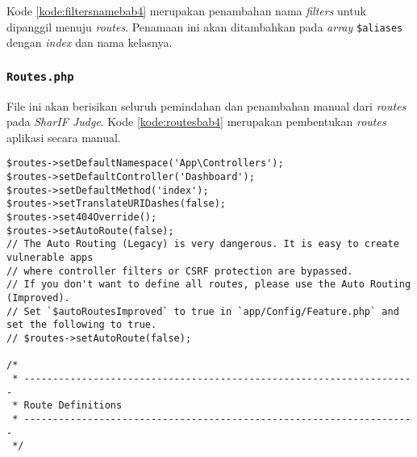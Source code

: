 Kode \ref{kode:filtersnamebab4} merupakan penambahan nama \textit{filters} untuk dipanggil menuju \textit{routes}. Penamaan ini akan ditambahkan pada \textit{array} \verb|$aliases| dengan \textit{index} dan nama kelasnya.
\subsubsection{\texttt{Routes.php}}
File ini akan berisikan seluruh pemindahan dan penambahan manual dari \textit{routes} pada \textit{SharIF Judge}. Kode \ref{kode:routesbab4} merupakan pembentukan \textit{routes} aplikasi secara manual.
\begin{lstlisting}[caption=Penambahan \textit{routes} yang digunakan pada aplikasi \textit{SharIF Judge}, label=kode:routesbab4]
	$routes->setDefaultNamespace('App\Controllers');
$routes->setDefaultController('Dashboard');
$routes->setDefaultMethod('index');
$routes->setTranslateURIDashes(false);
$routes->set404Override();
$routes->setAutoRoute(false);
// The Auto Routing (Legacy) is very dangerous. It is easy to create vulnerable apps
// where controller filters or CSRF protection are bypassed.
// If you don't want to define all routes, please use the Auto Routing (Improved).
// Set `$autoRoutesImproved` to true in `app/Config/Feature.php` and set the following to true.
// $routes->setAutoRoute(false);

/*
 * --------------------------------------------------------------------
 * Route Definitions
 * --------------------------------------------------------------------
 */


\end{lstlisting}
